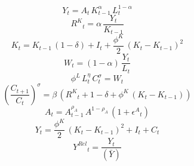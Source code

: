 \noindent[name= `Función de producción']
\begin{dmath}
{Y}_{t}={A}_{t}\, {K}_{t-1}^{{\alpha}}\, {L}_{t}^{1-{\alpha}}
\end{dmath}
\noindent[name= `Demanda de capital']
\begin{dmath}
{R^{K}}_{t}={\alpha}\, \frac{{Y}_{t}}{{K}_{t-1}}
\end{dmath}
\noindent[name= `Ley de acumulación de capital']
\begin{dmath}
{K}_{t}={K}_{t-1}\, \left(1-{\delta}\right)+{I}_{t}+\frac{{\phi^{K}}}{2}\, \left({K}_{t}-{K}_{t-1}\right)^{2}
\end{dmath}
\noindent[name= `Demanda de trabajo']
\begin{dmath}
{W}_{t}=\left(1-{\alpha}\right)\, \frac{{Y}_{t}}{{L}_{t}}
\end{dmath}
\noindent[name= `Oferta de trabajo']
\begin{dmath}
{\phi^{L}}\, {L}_{t}^{{\eta}}\, {C}_{t}^{{\sigma}}={W}_{t}
\end{dmath}
\noindent[name= `Ecuación de Euler']
\begin{dmath}
\left(\frac{{C}_{t+1}}{{C}_{t}}\right)^{{\sigma}}={\beta}\, \left({R^{K}}_{t}+1-{\delta}+{\phi^{K}}\, \left({K}_{t}-{K}_{t-1}\right)\right)
\end{dmath}
\noindent[name= `Productividad']
\begin{dmath}
{A}_{t}={A}_{t-1}^{{\rho_{A}}}\, {A}^{1-{\rho_{A}}}\, \left(1+{\epsilon^{A}}_{t}\right)
\end{dmath}
\noindent[name= `Demanda agregada']
\begin{dmath}
{Y}_{t}=\frac{{\phi^{K}}}{2}\, \left({K}_{t}-{K}_{t-1}\right)^{2}+{I}_{t}+{C}_{t}
\end{dmath}
\noindent[name= `Producción relativa al SS']
\begin{dmath}
{Y^{Rel}}_{t}=\frac{{Y}_{t}}{(\bar{Y})}
\end{dmath}
